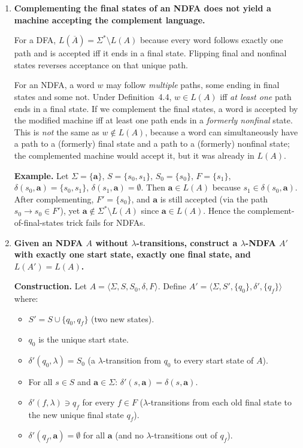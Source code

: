 \begin{enumerate}[{4.}1.]
\item \textbf{Complementing the final states of an NDFA does not yield a machine
accepting the complement language.}

For a DFA, $L(\overline{A})=\Sigma^*\setminus L(A)$ because every word follows
exactly one path and is accepted iff it ends in a final state.  Flipping final
and nonfinal states reverses acceptance on that unique path.

For an NDFA, a word $w$ may follow \emph{multiple} paths, some ending in final
states and some not.  Under Definition~4.4, $w\in L(A)$ iff \emph{at least one}
path ends in a final state.  If we complement the final states, a word is
accepted by the modified machine iff at least one path ends in a \emph{formerly
nonfinal} state.  This is \emph{not} the same as $w\notin L(A)$, because a word
can simultaneously have a path to a (formerly) final state and a path to a
(formerly) nonfinal state; the complemented machine would accept it, but it was
already in $L(A)$.

\textbf{Example.}  Let $\Sigma=\{\pmb{a}\}$, $S=\{s_0,s_1\}$, $S_0=\{s_0\}$,
$F=\{s_1\}$, $\delta(s_0,\pmb{a})=\{s_0,s_1\}$, $\delta(s_1,\pmb{a})=\emptyset$.
Then $\pmb{a}\in L(A)$ because $s_1\in\delta(s_0,\pmb{a})$.  After complementing,
$F'=\{s_0\}$, and $\pmb{a}$ is still accepted (via the path $s_0\to s_0\in F'$),
yet $\pmb{a}\notin\Sigma^*\setminus L(A)$ since $\pmb{a}\in L(A)$.  Hence the
complement-of-final-states trick fails for NDFAs.

\item \textbf{Given an NDFA $A$ without $\lambda$-transitions, construct a
$\lambda$-NDFA $A'$ with exactly one start state, exactly one final state, and
$L(A')=L(A)$.}

\textbf{Construction.}  Let $A=\langle\Sigma,S,S_0,\delta,F\rangle$.  Define
$A'=\langle\Sigma,S',\{q_0\},\delta',\{q_f\}\rangle$ where:
\begin{itemize}
  \item $S'=S\cup\{q_0,q_f\}$ (two new states).
  \item $q_0$ is the unique start state.
  \item $\delta'(q_0,\lambda)=S_0$ (a $\lambda$-transition from $q_0$ to every
        start state of $A$).
  \item For all $s\in S$ and $\pmb{a}\in\Sigma$: $\delta'(s,\pmb{a})=\delta(s,\pmb{a})$.
  \item $\delta'(f,\lambda)\ni q_f$ for every $f\in F$ ($\lambda$-transitions
        from each old final state to the new unique final state $q_f$).
  \item $\delta'(q_f,\pmb{a})=\emptyset$ for all $\pmb{a}$ (and no $\lambda$-transitions
        out of $q_f$).
\end{itemize}


\end{enumerate}
